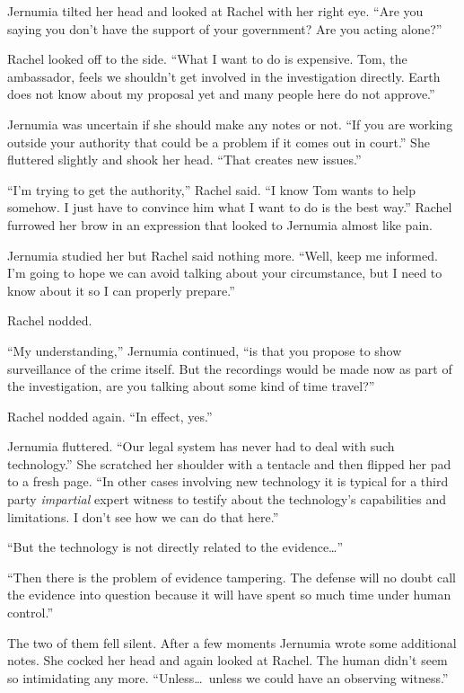 Jernumia tilted her head and looked at Rachel with her right eye. ``Are you saying you don't
have the support of your government? Are you acting alone?''

Rachel looked off to the side. ``What I want to do is expensive. Tom, the ambassador, feels we
shouldn't get involved in the investigation directly. Earth does not know about my proposal yet
and many people here do not approve.''

Jernumia was uncertain if she should make any notes or not. ``If you are working outside your
authority that could be a problem if it comes out in court.'' She fluttered slightly and shook
her head. ``That creates new issues.''

``I'm trying to get the authority,'' Rachel said. ``I know Tom wants to help somehow. I just
have to convince him what I want to do is the best way.'' Rachel furrowed her brow in an
expression that looked to Jernumia almost like pain.

Jernumia studied her but Rachel said nothing more. ``Well, keep me informed. I'm going to hope
we can avoid talking about your circumstance, but I need to know about it so I can properly
prepare.''

Rachel nodded.

``My understanding,'' Jernumia continued, ``is that you propose to show surveillance of the
crime itself. But the recordings would be made now as part of the investigation, are you talking
about some kind of time travel?''

Rachel nodded again. ``In effect, yes.''

Jernumia fluttered. ``Our legal system has never had to deal with such technology.'' She
scratched her shoulder with a tentacle and then flipped her pad to a fresh page. ``In other
cases involving new technology it is typical for a third party \emph{impartial} expert witness
to testify about the technology's capabilities and limitations. I don't see how we can do that
here.''

``But the technology is not directly related to the evidence\ldots''

``Then there is the problem of evidence tampering. The defense will no doubt call the evidence
into question because it will have spent so much time under human control.''

The two of them fell silent. After a few moments Jernumia wrote some additional notes. She
cocked her head and again looked at Rachel. The human didn't seem so intimidating any more.
``Unless\ldots\ unless we could have an observing witness.''

